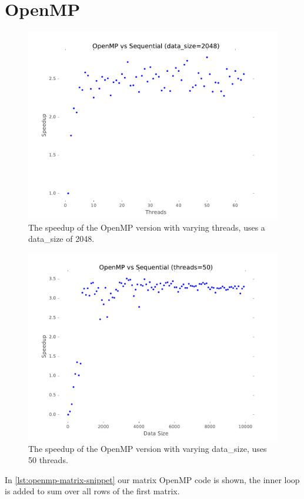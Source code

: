 \documentclass[final]{report}
\begin{document}
\chapter{OpenMP}
\begin{figure}[H]
\centering
    \includegraphics[width=\linewidth]{resources/openmp-number-of-threads-sweep.pdf}
    \caption{The speedup of the OpenMP version with varying threads, uses a data\_size of 2048.}
    \label{fig:openmp-number-of-threads-sweep}
\end{figure}

\begin{figure}[H]
\centering
    \includegraphics[width=\linewidth]{resources/openmp-data-size-sweep.pdf}
    \caption{The speedup of the OpenMP version with varying data\_size, uses 50 threads.}
    \label{fig:openmp-data-size-sweep}
\end{figure}

In \cref{lst:openmp-matrix-snippet} our matrix OpenMP code is shown, the inner loop is added to sum over all rows of the first matrix.
\end{document}
